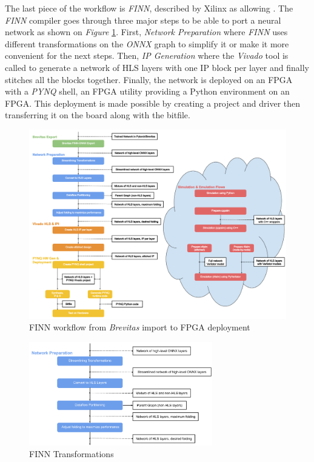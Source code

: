 The last piece of the workflow is \emph{FINN}, described by Xilinx as allowing . The \emph{FINN} compiler goes through three major steps to be able to port a neural network as shown on \emph{Figure} \ref{fig:FINNWholeFlow}. First, \emph{Network Preparation} where \emph{FINN} uses different transformations on the \emph{ONNX} graph to simplify it or make it more convenient for the next steps. Then, \emph{IP Generation} where the \emph{Vivado} tool is called to generate a network of HLS layers with one IP block per layer and finally stitches all the blocks together. Finally, the network is deployed on an FPGA with a \emph{PYNQ} shell, an FPGA utility providing a Python environment on an FPGA. This deployment is made possible by creating a project and driver then transferring it on the board along with the bitfile.

\begin{figure}[htbp]
	\centering
		\includegraphics[width=16cm]{Figures/FINNWholeFlow.png}
	\caption[FINN whole flow]{FINN workflow from \emph{Brevitas} import to FPGA deployment}
	\label{fig:FINNWholeFlow}
\end{figure}

\begin{figure}[htbp]
	\centering
		\includegraphics[width=8cm]{Figures/FINNTransformations.png}
	\caption[FINN Transformations]{FINN Transformations}
	\label{fig:FINNTransformations}
\end{figure}

